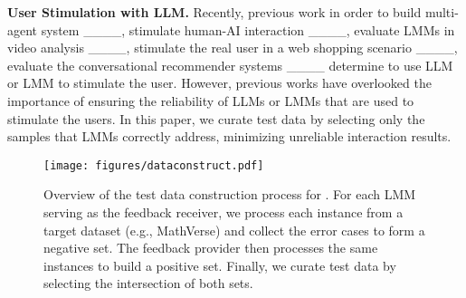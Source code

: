 \textbf{User Stimulation with LLM.} Recently, previous work in order to build multi-agent system ____, stimulate human-AI interaction ____, evaluate LMMs in video analysis ____, stimulate the real user in a web shopping scenario ____, evaluate the conversational recommender systems ____ determine to use LLM or LMM to stimulate the user. However, previous works have overlooked the importance of ensuring the reliability of LLMs or LMMs that are used to stimulate the users. In this paper, we curate test data by selecting only the samples that LMMs correctly address, minimizing unreliable interaction results.



\begin{figure*}[!t]
    \centering
    \texttt{[image: figures/dataconstruct.pdf]}
    \vspace{-1mm}
    \caption{Overview of the test data construction process for \bench{}. For each LMM serving as the feedback receiver, we process each instance from a target dataset (e.g., MathVerse) and collect the error cases to form a negative set. The feedback provider then processes the same instances to build a positive set. Finally, we curate test data by selecting the intersection of both sets.}
    \label{fig:dataconstruct}
\end{figure*}